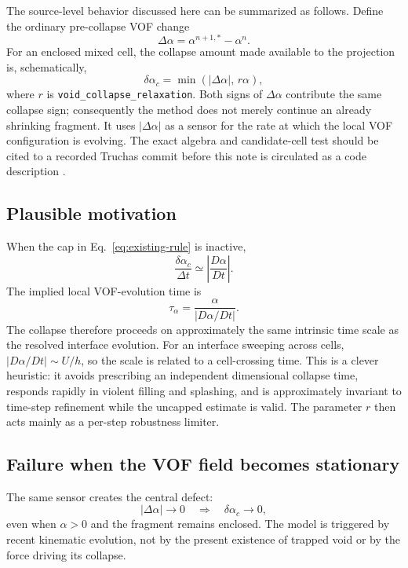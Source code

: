 \documentclass[11pt]{article}
\newcommand{\Dt}{\Delta t}
\begin{document}
The source-level behavior discussed here can be summarized as follows.  Define the
ordinary pre-collapse VOF change
\begin{equation}
  \Delta\alpha=\alpha^{n+1,*}-\alpha^n.
\end{equation}
For an enclosed mixed cell, the collapse amount made available to the projection is,
schematically,
\begin{equation}
  \boxed{\delta\alpha_c=\min\!\left(|\Delta\alpha|,\,r\alpha\right),}
  \label{eq:existing-rule}
\end{equation}
where \(r\) is \texttt{void\_collapse\_relaxation}.  Both signs of
\(\Delta\alpha\) contribute the same collapse sign; consequently the method does not
merely continue an already shrinking fragment.  It uses \(|\Delta\alpha|\) as a sensor
for the rate at which the local VOF configuration is evolving.  The exact algebra and
candidate-cell test should be cited to a recorded Truchas commit before this note is
circulated as a code description \cite{truchas-source}.

\subsection{Plausible motivation}

When the cap in Eq.~\eqref{eq:existing-rule} is inactive,
\begin{equation}
  \frac{\delta\alpha_c}{\Dt}\simeq
  \left|\frac{D\alpha}{Dt}\right|.
\end{equation}
The implied local VOF-evolution time is
\begin{equation}
  \tau_\alpha=\frac{\alpha}{|D\alpha/Dt|}.
\end{equation}
The collapse therefore proceeds on approximately the same intrinsic time scale as the
resolved interface evolution.  For an interface sweeping across cells,
\(|D\alpha/Dt|\sim U/h\), so the scale is related to a cell-crossing time.  This is a
clever heuristic: it avoids prescribing an independent dimensional collapse time,
responds rapidly in violent filling and splashing, and is approximately invariant to
time-step refinement while the uncapped estimate is valid.  The parameter \(r\) then
acts mainly as a per-step robustness limiter.

\subsection{Failure when the VOF field becomes stationary}

The same sensor creates the central defect:
\begin{equation}
  |\Delta\alpha|\longrightarrow0
  \quad\Longrightarrow\quad
  \delta\alpha_c\longrightarrow0,
\end{equation}
even when \(\alpha>0\) and the fragment remains enclosed.  The model is triggered by
recent kinematic evolution, not by the present existence of trapped void or by the force
driving its collapse.
\end{document}
